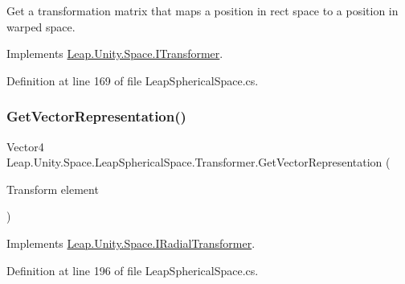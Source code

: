 Get a transformation matrix that maps a position in rect space to a position in warped space. 



Implements \mbox{\hyperlink{interface_leap_1_1_unity_1_1_space_1_1_i_transformer_a151be0f514da2568b75177fdb31724b3}{Leap.\+Unity.\+Space.\+I\+Transformer}}.



Definition at line 169 of file Leap\+Spherical\+Space.\+cs.

\mbox{\label{class_leap_1_1_unity_1_1_space_1_1_leap_spherical_space_1_1_transformer_ab2e6a163514c332db4c662754f37f385}} 
\subsubsection{\texorpdfstring{GetVectorRepresentation()}{GetVectorRepresentation()}}
{\footnotesize\ttfamily Vector4 Leap.\+Unity.\+Space.\+Leap\+Spherical\+Space.\+Transformer.\+Get\+Vector\+Representation (\begin{DoxyParamCaption}\item[{Transform}]{element }\end{DoxyParamCaption})}



Implements \mbox{\hyperlink{interface_leap_1_1_unity_1_1_space_1_1_i_radial_transformer_af08c4933956ae199215c193458086c66}{Leap.\+Unity.\+Space.\+I\+Radial\+Transformer}}.



Definition at line 196 of file Leap\+Spherical\+Space.\+cs.

\mbox{\label{class_leap_1_1_unity_1_1_space_1_1_leap_spherical_space_1_1_transformer_ac82a933f2e7851ccc455b11dd789dd87}} 
